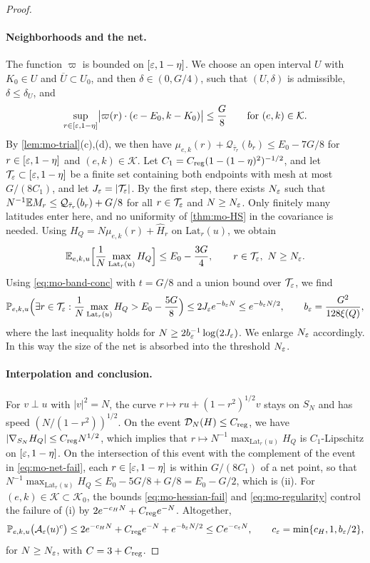 \begin{proof}
\paragraph{Neighborhoods and the net.}
The function $\varpi$ is bounded on $[\varepsilon,1-\eta]$. We choose an open interval $U$ with $K_0\in U$ and $\overline U\subset U_0$, and then $\delta\in(0,G/4)$, such that $(U,\delta)$ is admissible, $\delta\le\delta_U$, and
\begin{equation}\label{eq:mo-mark-cont}
\sup_{r\in[\varepsilon,1-\eta]}\bigl|\varpi(r)\cdot(e-E_0,k-K_0)\bigr|\le\frac G8\qquad\text{for }(e,k)\in\mathcal K.
\end{equation}
By \cref{lem:mo-trial}(c),(d), we then have $\mu_{e,k}(r)+\mathcal Q_{\bar\tau_r}(b_r)\le E_0-7G/8$ for $r\in[\varepsilon,1-\eta]$ and $(e,k)\in\mathcal K$. Let $C_1=C_{\rm reg}(1-(1-\eta)^2)^{-1/2}$, and let $\mathcal T_\varepsilon\subset[\varepsilon,1-\eta]$ be a finite set containing both endpoints with mesh at most $G/(8C_1)$, and let $J_\varepsilon=|\mathcal T_\varepsilon|$. By the first step, there exists $N_\varepsilon$ such that $N^{-1}\mathbb E M_r\le\mathcal Q_{\bar\tau_r}(b_r)+G/8$ for all $r\in\mathcal T_\varepsilon$ and $N\ge N_\varepsilon$. Only finitely many latitudes enter here, and no uniformity of \cref{thm:mo-HS} in the covariance is needed. Using $H_Q=N\mu_{e,k}(r)+\widehat H_r$ on $\mathrm{Lat}_r(u)$, we obtain
\[
\mathbb E_{e,k,u}\Bigl[\frac1N\max_{\mathrm{Lat}_r(u)}H_Q\Bigr]\le E_0-\frac{3G}4,\qquad r\in\mathcal T_\varepsilon,\ N\ge N_\varepsilon.
\]
Using \eqref{eq:mo-band-conc} with $t=G/8$ and a union bound over $\mathcal T_\varepsilon$, we find
\begin{equation}\label{eq:mo-net-fail}
\mathbb P_{e,k,u}\Bigl(\exists r\in\mathcal T_\varepsilon:\frac1N\max_{\mathrm{Lat}_r(u)}H_Q>E_0-\frac{5G}8\Bigr)\le2J_\varepsilon e^{-b_\varepsilon N}\le e^{-b_\varepsilon N/2},\qquad b_\varepsilon=\frac{G^2}{128\xi(Q)},
\end{equation}
where the last inequality holds for $N\ge2b_\varepsilon^{-1}\log(2J_\varepsilon)$. We enlarge $N_\varepsilon$ accordingly. In this way the size of the net is absorbed into the threshold $N_\varepsilon$.

\paragraph{Interpolation and conclusion.}
For $v\perp u$ with $|v|^2=N$, the curve $r\mapsto ru+(1-r^2)^{1/2}v$ stays on $S_N$ and has speed $(N/(1-r^2))^{1/2}$. On the event $\mathcal D_N(H)\le C_{\rm reg}$, we have $|\nabla_{S_N}H_Q|\le C_{\rm reg}N^{1/2}$, which implies that $r\mapsto N^{-1}\max_{\mathrm{Lat}_r(u)}H_Q$ is $C_1$-Lipschitz on $[\varepsilon,1-\eta]$. On the intersection of this event with the complement of the event in \eqref{eq:mo-net-fail}, each $r\in[\varepsilon,1-\eta]$ is within $G/(8C_1)$ of a net point, so that $N^{-1}\max_{\mathrm{Lat}_r(u)}H_Q\le E_0-5G/8+G/8=E_0-G/2$, which is (ii). For $(e,k)\in\mathcal K\subset\mathcal K_0$, the bounds \eqref{eq:mo-hessian-fail} and \eqref{eq:mo-regularity} control the failure of (i) by $2e^{-c_HN}+C_{\rm reg}e^{-N}$. Altogether,
\[
\mathbb P_{e,k,u}\bigl(\mathcal A_\varepsilon(u)^c\bigr)\le2e^{-c_HN}+C_{\rm reg}e^{-N}+e^{-b_\varepsilon N/2}\le Ce^{-c_\varepsilon N},\qquad c_\varepsilon=\min\{c_H,1,b_\varepsilon/2\},
\]
for $N\ge N_\varepsilon$, with $C=3+C_{\rm reg}$.


\end{proof}
